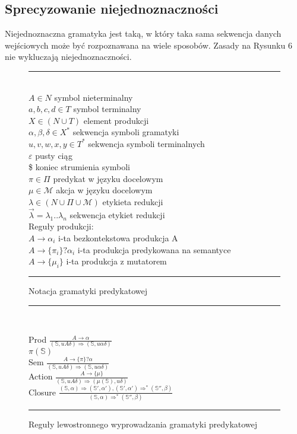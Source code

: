 \subsection{Sprecyzowanie niejednoznaczności}
Niejednoznaczna gramatyka jest taką, w który taka sama sekwencja danych wejściowych
może być rozpoznawana na wiele sposobów.
Zasady na Rysunku 6 nie wykluczają niejednoznaczności. 

\begin{figure}[h]
\noindent\rule{\linewidth}{1pt} \\
\( A \in N \) symbol nieterminalny \\
\( a,b,c,d \in T \) symbol terminalny \\
\( X \in (N \cup T) \) element produkcji \\
\( \alpha,\beta,\delta \in X^* \) sekwencja symboli gramatyki \\
\( u,v,w,x,y \in T^* \) sekwencja symboli terminalnych \\
\( \varepsilon \) pusty ciąg \\
\$ koniec strumienia symboli \\
\( \pi \in \Pi \) predykat w języku docelowym \\
\( \mu \in \mathcal{M} \) akcja w języku docelowym \\
\( \lambda \in (N \cup \Pi \cup \mathcal{M}) \) etykieta redukcji \\
\( \overset{\rightarrow}{\lambda} = \lambda_1 ..\lambda_n\) sekwencja etykiet redukcji \\
Reguły produkcji:\\
\( A \rightarrow \alpha_i \) i-ta bezkontekstowa produkcja A \\
\( A \rightarrow \{ \pi_i \} ? \alpha_i \) i-ta produkcja predykowana na semantyce \\
\( A \rightarrow \{ \mu_i \} \) i-ta produkcja z mutatorem \\
\noindent\rule{\linewidth}{1pt} 
\caption{Notacja gramatyki predykatowej}
\end{figure}

\begin{figure}[h]
\noindent\rule{\linewidth}{1pt} \\
\begin{adjustwidth}{2cm}{}
Prod \( \frac{A \rightarrow \alpha}{ (\mathbb{S}, uA\delta) \Rightarrow (\mathbb{S}, u\alpha\delta)} \) 
\\
\( \pi(\mathbb{S}) \)
\\
Sem \( \frac{A \rightarrow \{ \pi \} ? \alpha}{ (\mathbb{S}, uA\delta) \Rightarrow (\mathbb{S}, u\alpha\delta)} \) 
\\
Action \( \frac{A \rightarrow \{ \mu \} }{ (\mathbb{S}, uA\delta) \Rightarrow (\mu (\mathbb{S}), u\delta)} \) 
\\
Closure \( \frac{ (\mathbb{S},\alpha) \Rightarrow (\mathbb{S'},\alpha'),
(\mathbb{S'},\alpha') \Rightarrow^* (\mathbb{S''},\beta) }{(\mathbb{S},\alpha) \Rightarrow^* (\mathbb{S''},\beta)} \) 
\\
\end{adjustwidth}
\noindent\rule{\linewidth}{1pt}
\caption{Reguły lewostronnego wyprowadzania gramatyki predykatowej}
\end{figure}

